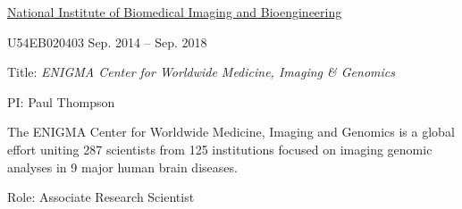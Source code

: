\documentclass[10pt]{article}
\makeatletter
\newlength{\bibhang}
\newlength{\bibsep}
 {\@listi \global\bibsep\itemsep \global\advance\bibsep by\parsep}
\newenvironment{bibsection}%
        {\vspace{-\baselineskip}\begin{list}{}{%
       \setlength{\leftmargin}{\bibhang}%
       \setlength{\itemindent}{-\leftmargin}%
       \setlength{\itemsep}{\bibsep}%
       \setlength{\parsep}{\z@}%
        \setlength{\partopsep}{0pt}%
        \setlength{\topsep}{0pt}}}
        {\end{list}\vspace{-.6\baselineskip}}
\newenvironment{outerlist}[1][\enskip\textbullet]%
        {\begin{itemize}[#1]}{\end{itemize}%
         \vspace{-.6\baselineskip}}
\newenvironment{innerlist}[1][\enskip\textbullet]%
        {\begin{compactitem}[#1]}{\end{compactitem}}
\makeatother
\begin{document}
\begin{bibsection}
\begin{outerlist}
\end{outerlist}
\item \href{https://www.nibib.nih.gov/}{National Institute of Biomedical Imaging and Bioengineering}
\begin{outerlist}
\item[] U54EB020403 \hfill{Sep. 2014 -- Sep. 2018}
\begin{innerlist}
\item Title: \emph{ENIGMA Center for Worldwide Medicine, Imaging \& Genomics}
\item PI:  Paul Thompson
\item The ENIGMA Center for Worldwide Medicine, Imaging and Genomics is a global effort uniting 287 scientists from 125 institutions focused on imaging genomic analyses in 9 major human brain diseases.
\item Role: Associate Research Scientist\\
\end{innerlist}
\end{outerlist}
\end{bibsection}
\end{document}
